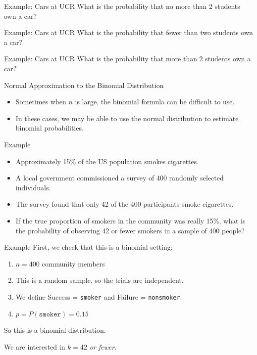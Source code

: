 \begin{frame}{Example: Cars at UCR}
    What is the probability that no more than 2 students own a car?
\end{frame}

\begin{frame}{Example: Cars at UCR}
    What is the probability that fewer than two students own a car?
\end{frame}

\begin{frame}{Example: Cars at UCR}
    What is the probability that more than 2 students own a car?
\end{frame}

\begin{frame}{Normal Approximation to the Binomial Distribution}
    \begin{itemize}
        \item Sometimes when $n$ is large, the binomial formula can be difficult to use.
        \item In these cases, we may be able to use the normal distribution to estimate binomial probabilities.
    \end{itemize}
\end{frame}

\begin{frame}{Example}
    \begin{itemize}
        \item Approximately 15\% of the US population smokes cigarettes. 
        \item A local government commissioned a survey of 400 randomly selected individuals. 
        \item The survey found that only 42 of the 400 participants smoke cigarettes. 
        \item If the true proportion of smokers in the community was really 15\%, what is the probability of observing 42 or fewer smokers in a sample of 400 people?
    \end{itemize}
\end{frame}

\begin{frame}{Example}
    First, we check that this is a binomial setting:
    \begin{enumerate}
        \item $n=400$ community members
        \item This is a random sample, so the trials are independent.
        \item We define Success = \texttt{smoker} and Failure = \texttt{nonsmoker}.
        \item $p = P(\texttt{smoker}) = 0.15$
    \end{enumerate}
    So this is a binomial distribution. 
    
    \vspace{12pt}We are interested in $k=42$ \textit{or fewer}.
\end{frame}

